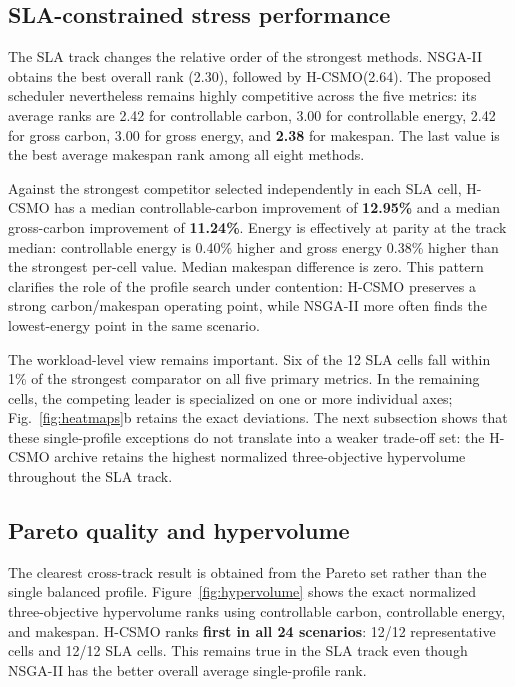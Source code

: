 \documentclass[preprint,12pt]{elsarticle}
\newcommand{\method}{H-CSMO\xspace}
\newcommand{\good}[1]{\textbf{#1}}
\begin{document}
\subsection{SLA-constrained stress performance}

The SLA track changes the relative order of the strongest methods. NSGA-II obtains the best overall rank (2.30), followed by \method (2.64). The proposed scheduler nevertheless remains highly competitive across the five metrics: its average ranks are 2.42 for controllable carbon, 3.00 for controllable energy, 2.42 for gross carbon, 3.00 for gross energy, and \good{2.38} for makespan. The last value is the best average makespan rank among all eight methods.

Against the strongest competitor selected independently in each SLA cell, \method has a median controllable-carbon improvement of \good{12.95\%} and a median gross-carbon improvement of \good{11.24\%}. Energy is effectively at parity at the track median: controllable energy is 0.40\% higher and gross energy 0.38\% higher than the strongest per-cell value. Median makespan difference is zero. This pattern clarifies the role of the profile search under contention: \method preserves a strong carbon/makespan operating point, while NSGA-II more often finds the lowest-energy point in the same scenario.

The workload-level view remains important. Six of the 12 SLA cells fall within 1\% of the strongest comparator on all five primary metrics. In the remaining cells, the competing leader is specialized on one or more individual axes; Fig.~\ref{fig:heatmaps}b retains the exact deviations. The next subsection shows that these single-profile exceptions do not translate into a weaker trade-off set: the \method archive retains the highest normalized three-objective hypervolume throughout the SLA track.

\subsection{Pareto quality and hypervolume}
\label{sec:pareto-results}

The clearest cross-track result is obtained from the Pareto set rather than the single balanced profile. Figure~\ref{fig:hypervolume} shows the exact normalized three-objective hypervolume ranks using controllable carbon, controllable energy, and makespan. \method ranks \good{first in all 24 scenarios}: 12/12 representative cells and 12/12 SLA cells. This remains true in the SLA track even though NSGA-II has the better overall average single-profile rank.
\end{document}
